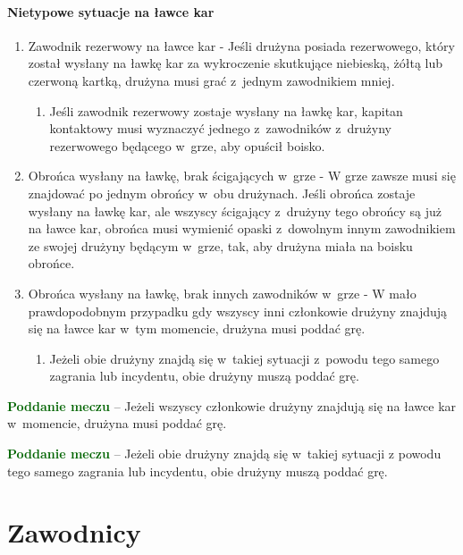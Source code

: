 \documentclass[12pt,a4paper]{article}
\newcommand\other[1]{\bgroup\textcolor{darkgreen}{\textbf{#1}}}
\begin{document}
\paragraph{Nietypowe sytuacje na ławce kar}

\begin{enumerate}
	\item
	      Zawodnik rezerwowy na ławce kar - Jeśli drużyna posiada rezerwowego,
	      który został wysłany na ławkę kar za wykroczenie skutkujące niebieską,
	      żółtą lub czerwoną kartką, drużyna musi grać z~jednym zawodnikiem
	      mniej.

	      \begin{enumerate}
		      \item
		            Jeśli zawodnik rezerwowy zostaje wysłany na ławkę kar, kapitan
		            kontaktowy musi wyznaczyć jednego z~zawodników z~drużyny rezerwowego
		            będącego w~grze, aby opuścił boisko.
	      \end{enumerate}
	\item
	      Obrońca wysłany na ławkę, brak ścigających w~grze - W grze zawsze musi
	      się znajdować po jednym obrońcy w~obu drużynach. Jeśli obrońca zostaje
	      wysłany na ławkę kar, ale wszyscy ścigający z~drużyny tego obrońcy są
	      już na ławce kar, obrońca musi wymienić opaski z~dowolnym innym
	      zawodnikiem ze swojej drużyny będącym w~grze, tak, aby drużyna miała
	      na boisku obrońce.
	\item
	      Obrońca wysłany na ławkę, brak innych zawodników w~grze - W mało
	      prawdopodobnym przypadku gdy wszyscy inni członkowie drużyny znajdują
	      się na ławce kar w~tym momencie, drużyna musi poddać grę.

	      \begin{enumerate}
		      \item
		            Jeżeli obie drużyny znajdą się w~takiej sytuacji z~powodu tego
		            samego zagrania lub incydentu, obie drużyny muszą poddać grę.
	      \end{enumerate}
\end{enumerate}

\other{Poddanie meczu} -- Jeżeli wszyscy członkowie drużyny znajdują się
na ławce kar w~momencie, drużyna musi poddać grę.

\other{Poddanie meczu} -- Jeżeli obie drużyny znajdą się w~takiej sytuacji
z powodu tego samego zagrania lub incydentu, obie drużyny muszą poddać
grę.


\pagebreak
\section{Zawodnicy}
\end{document}
